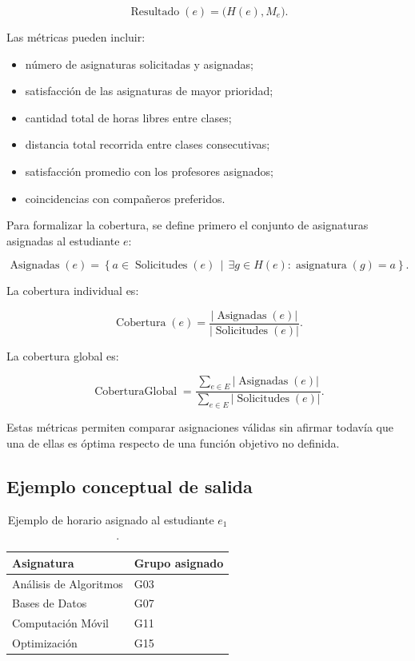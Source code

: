 \documentclass[11pt]{article}
\numberwithin{equation}{section}
\numberwithin{figure}{section}
\numberwithin{table}{section}
\theoremstyle{definition}
\begin{document}
\[
\operatorname{Resultado}(e)=\bigl(H(e),M_e\bigr).
\]

Las métricas pueden incluir:

\begin{itemize}
  \item número de asignaturas solicitadas y asignadas;
  \item satisfacción de las asignaturas de mayor prioridad;
  \item cantidad total de horas libres entre clases;
  \item distancia total recorrida entre clases consecutivas;
  \item satisfacción promedio con los profesores asignados;
  \item coincidencias con compañeros preferidos.
\end{itemize}

Para formalizar la cobertura, se define primero el conjunto de asignaturas
asignadas al estudiante $e$:

\[
\operatorname{Asignadas}(e)=
\left\{a\in\operatorname{Solicitudes}(e)\,\middle|\,
\exists g\in H(e):\operatorname{asignatura}(g)=a\right\}.
\]

La cobertura individual es:

\[
\operatorname{Cobertura}(e)=
\frac{|\operatorname{Asignadas}(e)|}
     {|\operatorname{Solicitudes}(e)|}.
\]

La cobertura global es:

\[
\operatorname{CoberturaGlobal}=
\frac{\displaystyle\sum_{e\in E}|\operatorname{Asignadas}(e)|}
     {\displaystyle\sum_{e\in E}|\operatorname{Solicitudes}(e)|}.
\]

Estas métricas permiten comparar asignaciones válidas sin afirmar todavía que
una de ellas es óptima respecto de una función objetivo no definida.

\subsection{Ejemplo conceptual de salida}

\begin{table}[H]
\centering
\caption{Ejemplo de horario asignado al estudiante $e_1$.}
\begin{tabular}{ll}
\toprule
\textbf{Asignatura} & \textbf{Grupo asignado} \\
\midrule
Análisis de Algoritmos & G03 \\
Bases de Datos         & G07 \\
Computación Móvil      & G11 \\
Optimización           & G15 \\
\bottomrule
\end{tabular}
\end{table}
\end{document}
